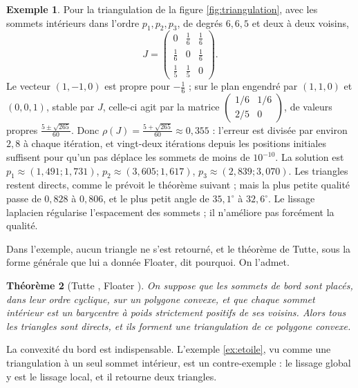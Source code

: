 \documentclass[11pt,a4paper]{article}
\theoremstyle{plain}
\newtheorem{theoreme}{Théorème}[section]
\theoremstyle{definition}
\newtheorem{exemple}[theoreme]{Exemple}
\theoremstyle{remark}
\begin{document}
\begin{exemple}\label{ex:laplacien}
Pour la triangulation de la figure \ref{fig:triangulation}, avec les sommets intérieurs dans l'ordre $p_1,p_2,p_3$, de degrés $6,6,5$ et deux à deux voisins,
\[
  J=\begin{pmatrix}0&\frac16&\frac16\\[2pt]\frac16&0&\frac16\\[2pt]\frac15&\frac15&0\end{pmatrix}.
\]
Le vecteur $(1,-1,0)$ est propre pour $-\frac16$ ; sur le plan engendré par $(1,1,0)$ et $(0,0,1)$, stable par $J$, celle-ci agit par la matrice $\begin{pmatrix}1/6&1/6\\2/5&0\end{pmatrix}$, de valeurs propres $\frac{5\pm\sqrt{265}}{60}$. Donc $\rho(J)=\frac{5+\sqrt{265}}{60}\approx0{,}355$ : l'erreur est divisée par environ $2{,}8$ à chaque itération, et vingt-deux itérations depuis les positions initiales suffisent pour qu'un pas déplace les sommets de moins de $10^{-10}$. La solution est $p_1\approx(1{,}491;1{,}731)$, $p_2\approx(3{,}605;1{,}617)$, $p_3\approx(2{,}839;3{,}070)$. Les triangles restent directs, comme le prévoit le théorème suivant ; mais la plus petite qualité passe de $0{,}828$ à $0{,}806$, et le plus petit angle de $35{,}1^\circ$ à $32{,}6^\circ$. Le lissage laplacien régularise l'espacement des sommets ; il n'améliore pas forcément la qualité.
\end{exemple}

Dans l'exemple, aucun triangle ne s'est retourné, et le théorème de Tutte, sous la forme générale que lui a donnée Floater, dit pourquoi. On l'admet.

\begin{theoreme}[Tutte \cite{tutte}, Floater \cite{floater}]\label{thm:tutte}
On suppose que les sommets de bord sont placés, dans leur ordre cyclique, sur un polygone convexe, et que chaque sommet intérieur est un barycentre à poids strictement positifs de ses voisins. Alors tous les triangles sont directs, et ils forment une triangulation de ce polygone convexe.
\end{theoreme}

La convexité du bord est indispensable. L'exemple \ref{ex:etoile}, vu comme une triangulation à un seul sommet intérieur, est un contre-exemple : le lissage global y est le lissage local, et il retourne deux triangles.

\end{document}
